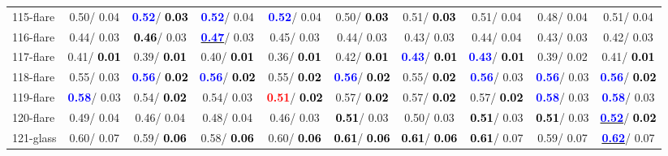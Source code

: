 \begin{table}[h]
\begin{center}
{\begin{tabular}{lc|c|c|c|c|c|c|c|c}
115-flare &   0.50/  0.04 & \textcolor{blue}{\textbf{  0.52}}/\textcolor{black}{\textbf{  0.03}} & \textcolor{blue}{\textbf{  0.52}}/  0.04 & \textcolor{blue}{\textbf{  0.52}}/  0.04 &   0.50/\textcolor{black}{\textbf{  0.03}} &   0.51/\textcolor{black}{\textbf{  0.03}} &   0.51/  0.04 &   0.48/  0.04 &   0.51/  0.04 \\
116-flare &   0.44/  0.03 & \textcolor{black}{\textbf{  0.46}}/  0.03 & \underline{\textcolor{blue}{\textbf{  0.47}}}/  0.03 &   0.45/  0.03 &   0.44/  0.03 &   0.43/  0.03 &   0.44/  0.04 &   0.43/  0.03 &   0.42/  0.03 \\
117-flare &   0.41/\textcolor{black}{\textbf{  0.01}} &   0.39/\textcolor{black}{\textbf{  0.01}} &   0.40/\textcolor{black}{\textbf{  0.01}} &   0.36/\textcolor{black}{\textbf{  0.01}} &   0.42/\textcolor{black}{\textbf{  0.01}} & \textcolor{blue}{\textbf{  0.43}}/\textcolor{black}{\textbf{  0.01}} & \textcolor{blue}{\textbf{  0.43}}/\textcolor{black}{\textbf{  0.01}} &   0.39/  0.02 &   0.41/\textcolor{black}{\textbf{  0.01}} \\ \hline
118-flare &   0.55/  0.03 & \textcolor{blue}{\textbf{  0.56}}/\textcolor{black}{\textbf{  0.02}} & \textcolor{blue}{\textbf{  0.56}}/\textcolor{black}{\textbf{  0.02}} &   0.55/\textcolor{black}{\textbf{  0.02}} & \textcolor{blue}{\textbf{  0.56}}/\textcolor{black}{\textbf{  0.02}} &   0.55/\textcolor{black}{\textbf{  0.02}} & \textcolor{blue}{\textbf{  0.56}}/  0.03 & \textcolor{blue}{\textbf{  0.56}}/  0.03 & \textcolor{blue}{\textbf{  0.56}}/\textcolor{black}{\textbf{  0.02}} \\
119-flare & \textcolor{blue}{\textbf{  0.58}}/  0.03 &   0.54/\textcolor{black}{\textbf{  0.02}} &   0.54/  0.03 & \textcolor{red}{\textbf{  0.51}}/\textcolor{black}{\textbf{  0.02}} &   0.57/\textcolor{black}{\textbf{  0.02}} &   0.57/\textcolor{black}{\textbf{  0.02}} &   0.57/\textcolor{black}{\textbf{  0.02}} & \textcolor{blue}{\textbf{  0.58}}/  0.03 & \textcolor{blue}{\textbf{  0.58}}/  0.03 \\
120-flare &   0.49/  0.04 &   0.46/  0.04 &   0.48/  0.04 &   0.46/  0.03 & \textcolor{black}{\textbf{  0.51}}/  0.03 &   0.50/  0.03 & \textcolor{black}{\textbf{  0.51}}/  0.03 & \textcolor{black}{\textbf{  0.51}}/  0.03 & \underline{\textcolor{blue}{\textbf{  0.52}}}/\textcolor{black}{\textbf{  0.02}} \\
121-glass &   0.60/  0.07 &   0.59/\textcolor{black}{\textbf{  0.06}} &   0.58/\textcolor{black}{\textbf{  0.06}} &   0.60/\textcolor{black}{\textbf{  0.06}} & \textcolor{black}{\textbf{  0.61}}/\textcolor{black}{\textbf{  0.06}} & \textcolor{black}{\textbf{  0.61}}/\textcolor{black}{\textbf{  0.06}} & \textcolor{black}{\textbf{  0.61}}/  0.07 &   0.59/  0.07 & \underline{\textcolor{blue}{\textbf{  0.62}}}/  0.07 \\

\end{tabular}}
\end{center}
\end{table}

